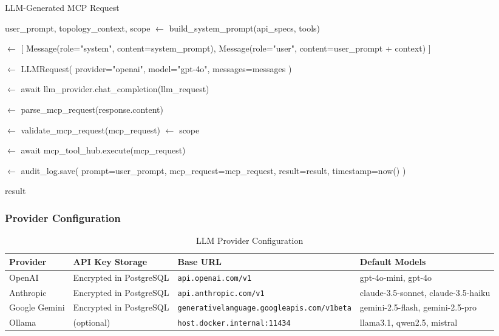 \documentclass[10pt,a4paper]{article}
\begin{document}
\begin{algorithm}
\caption{LLM-Generated MCP Request}
\begin{algorithmic}[H]
\REQUIRE user\_prompt, topology\_context, scope
 $\leftarrow$ build\_system\_prompt(api\_specs, tools)

 $\leftarrow$ [
    Message(role="system", content=system\_prompt),
    Message(role="user", content=user\_prompt + context)
]

 $\leftarrow$ LLMRequest(
    provider="openai",
    model="gpt-4o",
    messages=messages
)

 $\leftarrow$ await llm\_provider.chat\_completion(llm\_request)

 $\leftarrow$ parse\_mcp\_request(response.content)

 $\leftarrow$ validate\_mcp\_request(mcp\_request)
 $\leftarrow$ scope

 $\leftarrow$ await mcp\_tool\_hub.execute(mcp\_request)

 $\leftarrow$ audit\_log.save(
    prompt=user\_prompt,
    mcp\_request=mcp\_request,
    result=result,
    timestamp=now()
)

\RETURN result
\end{algorithmic}
\end{algorithm}

\subsubsection{Provider Configuration}

\begin{table}[htbp]
\centering
\caption{LLM Provider Configuration}
\begin{tabularx}{\textwidth}{lXXX}
\toprule
\textbf{Provider} & \textbf{API Key Storage} & \textbf{Base URL} & \textbf{Default Models} \\
\midrule
OpenAI & Encrypted in PostgreSQL & \texttt{api.openai.com/v1} & gpt-4o-mini, gpt-4o \\
Anthropic & Encrypted in PostgreSQL & \texttt{api.anthropic.com/v1} & claude-3.5-sonnet, claude-3.5-haiku \\
Google Gemini & Encrypted in PostgreSQL & \texttt{generativelanguage.googleapis.com/v1beta} & gemini-2.5-flash, gemini-2.5-pro \\
Ollama & (optional) & \texttt{host.docker.internal:11434} & llama3.1, qwen2.5, mistral \\
\bottomrule
\end{tabularx}
\end{table}
\end{document}
